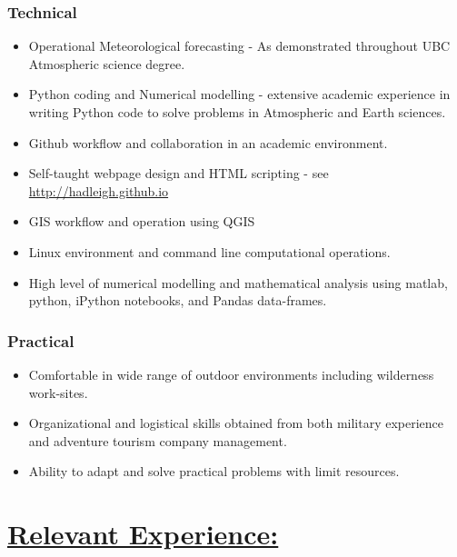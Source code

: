\documentclass[]{article}
\begin{document}
\subsubsection*{Technical}
\begin{itemize}
\item Operational Meteorological forecasting - As demonstrated throughout UBC Atmospheric science degree.
\item Python coding and Numerical modelling - extensive academic experience in writing Python code to solve problems in Atmospheric and Earth sciences.
\item Github workflow and collaboration in an academic environment.
\item Self-taught webpage design and HTML scripting - see \url{http://hadleigh.github.io}
\item GIS workflow and operation using QGIS
\item Linux environment and command line computational operations.
\item High level of numerical modelling and mathematical analysis using matlab, python, iPython notebooks, and Pandas data-frames.
\end{itemize}
\subsubsection*{Practical}
\begin{itemize}
\item Comfortable in wide range of outdoor environments including wilderness work-sites. 
\item Organizational and logistical skills obtained from both military experience and adventure tourism company management.
\item Ability to adapt and solve practical problems with limit resources.
\end{itemize}

\section*{\underline{Relevant Experience:}}
\end{document}
